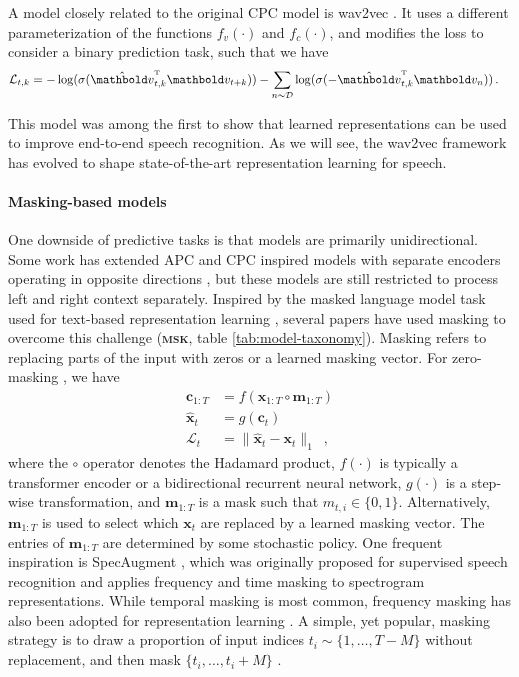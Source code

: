 {A model closely related to the original CPC model is wav2vec \cite{schneider_wav2vec_2019}. It uses a different parameterization of the functions $f_v(\cdot)$ and $f_c(\cdot)$, and modifies the loss to consider a binary prediction task, such that we have
%
\begin{align}
    \mathcal{L}_{t,k} &= - \log(\sigma(\hat{\mathbf{v}}_{t,k}^{\text{\tiny T}}\mathbf{v}_{t+k})) - \sum_{n \sim \mathcal{D}} \log(\sigma(-\hat{\mathbf{v}}_{t,k}^{\text{\tiny T}}\mathbf{v}_{n})) \,.
    \label{eq_brief: wav2vec loss}
\end{align}

\noindent This model was among the first to show that learned representations can be used to improve end-to-end speech recognition. As we will see, the wav2vec framework has evolved to shape state-of-the-art representation learning for speech.


\paragraph{Masking-based models} One downside of predictive tasks is that models are primarily unidirectional. Some work has extended APC and CPC inspired models with separate encoders operating in opposite directions \cite{ling_deep_2020, kawakami_learning_2020, borgholt_scaling_2021}, but these models are still restricted to process left and right context separately. Inspired by the masked language model task used for text-based representation learning \cite{devlin_bert_2018}, several papers have used masking to overcome this challenge (\textbf{\textsc{msk}}, table \ref{tab:model-taxonomy}). Masking refers to replacing parts of the input with zeros or a learned masking vector. For zero-masking \cite{jiang_improving_2019, liu_mockingjay_2020, wang_unsupervised_2020, chi_audio_2020, ling_decoar_2020}, we have
\begin{align}
    \mathbf{c}_{1:T} &= f(\mathbf{x}_{1:T} \circ \mathbf{m}_{1:T})\\
    \mathbf{\hat{x}}_{t} &= g(\mathbf{c}_{t}) \\
    \mathcal{L}_t &= \lVert \mathbf{\hat{x}}_{t} - \mathbf{x}_{t} \rVert_1\enspace,
\end{align}
where the $\circ$ operator denotes the Hadamard product, $f(\cdot)$ is typically a transformer encoder or a bidirectional recurrent neural network, $g(\cdot)$ is a step-wise transformation, and $\mathbf{m}_{1:T}$ is a mask such that $m_{t,i} \in \{0,1\}$. Alternatively, $\mathbf{m}_{1:T}$ is used to select which $\mathbf{x}_t$ are replaced by a learned masking vector. The entries of $\mathbf{m}_{1:T}$ are determined by some stochastic policy. One frequent inspiration is SpecAugment \cite{park_specaugment_2019}, which was originally proposed for supervised speech recognition and applies frequency and time masking to spectrogram representations.
While temporal masking is most common, frequency masking has also been adopted for representation learning  \cite{wang_unsupervised_2020}. A simple, yet popular, masking strategy is to draw a proportion of input indices $t_i\sim\{1,\dots,T-M\}$ without replacement, and then mask $\{t_i, \dots, t_i+M\}$ \cite{baevski_wav2vec_2020, hsu_hubert_2021, ling_decoar_2020}.

}
